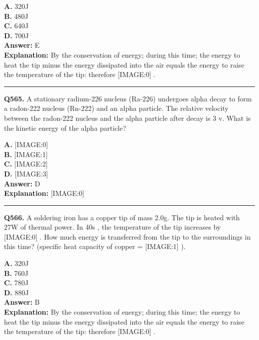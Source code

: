 \documentclass[12pt]{article}
\begin{document}
\textbf{A.} 320J \\
\textbf{B.} 480J \\
\textbf{C.} 640J \\
\textbf{D.} 700J \\

\textbf{Answer:} E \\
\textbf{Explanation:} By the conservation of energy; during this time; the energy to heat the tip minus the energy dissipated into the air equals the energy to raise the temperature of the tip: therefore
[IMAGE:0]
.

\hrule
\vspace{1em}


\noindent
\textbf{Q565.} A stationary radium-226 nucleus (Ra-226) undergoes alpha decay to form a radon-222 nucleus (Rn-222) and an alpha particle. The relative velocity between the radon-222 nucleus and the alpha particle after decay is
3
v. What is the kinetic energy of the alpha particle?



\textbf{A.} [IMAGE:0] \\
\textbf{B.} [IMAGE:1] \\
\textbf{C.} [IMAGE:2] \\
\textbf{D.} [IMAGE:3] \\

\textbf{Answer:} D \\
\textbf{Explanation:} [IMAGE:0]

\hrule
\vspace{1em}


\noindent
\textbf{Q566.} A soldering iron has a copper tip of mass 2.0g.
The tip is heated with 27W
of thermal power. In 40s
, the temperature of the tip increases by
[IMAGE:0]
.
How much energy is transferred from the tip to the surroundings in this time? (specific heat capacity of copper =
[IMAGE:1]
).



\textbf{A.} 320J \\
\textbf{B.} 760J \\
\textbf{C.} 780J \\
\textbf{D.} 880J \\

\textbf{Answer:} B \\
\textbf{Explanation:} By the conservation of energy; during this time; the energy to heat the tip minus the energy dissipated into the air equals the energy to raise the temperature of the tip: therefore
[IMAGE:0]
.
\end{document}
